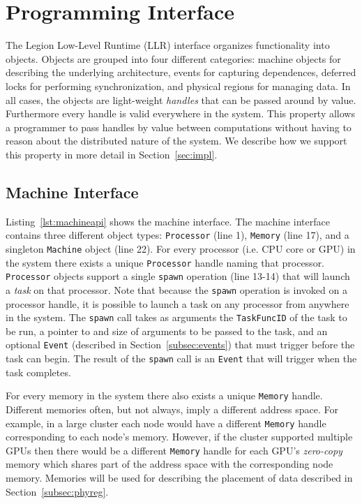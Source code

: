 
\section{Programming Interface}
\label{sec:interface}

The Legion Low-Level Runtime (LLR) interface organizes
functionality into objects.  Objects are grouped into
four different categories: machine objects for describing
the underlying architecture, events for capturing dependences,
deferred locks for performing synchronization, and physical regions
for managing data.  In all cases, the objects are light-weight
{\em handles} that can be passed around by value.  Furthermore
every handle is valid everywhere in the system.  This property allows 
a programmer to pass handles by value between computations without
having to reason about the distributed nature of the system.
We describe how we support this property in more detail in 
Section~\ref{sec:impl}.

\lstset{
  captionpos=b,
  language=C++,
  basicstyle=\scriptsize,
  numbers=left,
  numberstyle=\tiny,
  columns=fullflexible,
  stepnumber=1,
  escapechar=\#,
  keepspaces=true,
}
\subsection{Machine Interface}
\label{subsec:machmodel}
Listing~\ref{lst:machineapi} shows the machine interface.  The machine interface 
contains three different object types: {\tt Processor} (line 1), {\tt Memory} (line 17), and a 
singleton {\tt Machine} object (line 22).  For every processor (i.e. CPU core or GPU) in 
the system there exists a unique {\tt Processor} handle naming that processor.  
{\tt Processor} objects support a single {\tt spawn} operation (line 13-14) that will
launch a {\em task} on that processor.  Note that because the {\tt spawn} operation
is invoked on a processor handle, it is possible to launch a task on any
processor from anywhere in the system.  The {\tt spawn} call takes as arguments
the {\tt TaskFuncID} of the task to be run, a pointer to and size of arguments to
be passed to the task, and an optional {\tt Event} (described in Section~\ref{subsec:events})
that must trigger before the task can begin.  The result of the {\tt spawn} call
is an {\tt Event} that will trigger when the task completes. 

For every memory in the system there also exists a unique {\tt Memory} handle. 
Different memories often, but not always, imply a different address space.  For
example, in a large cluster each node would have a different {\tt Memory} handle
corresponding to each node's memory.
However, if the cluster supported multiple GPUs then there would be a different
{\tt Memory} handle for each GPU's {\em zero-copy} memory which shares part of the 
address space with the corresponding node memory.  Memories will be used for describing
the placement of data described in Section~\ref{subsec:phyreg}.

